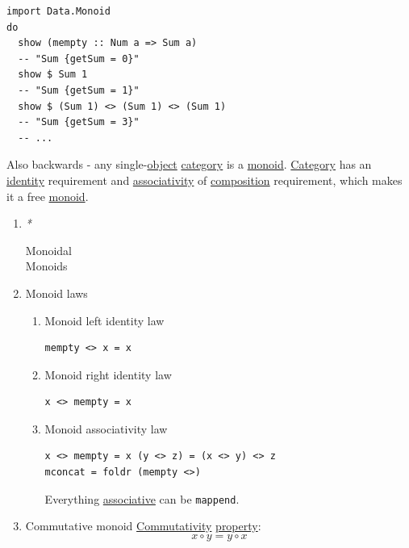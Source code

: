 \documentclass[11pt]{article}
\begin{document}
\begin{verbatim}
import Data.Monoid
do
  show (mempty :: Num a => Sum a)
  -- "Sum {getSum = 0}"
  show $ Sum 1
  -- "Sum {getSum = 1}"
  show $ (Sum 1) <> (Sum 1) <> (Sum 1)
  -- "Sum {getSum = 3}"
  -- ...
\end{verbatim}

Also backwards - any single-\hyperref[org4be0e9d]{object} \hyperref[org0450535]{category} is a \hyperref[org37d140b]{monoid}. \hyperref[org0450535]{Category} has an \hyperref[org9b95fd5]{identity} requirement and \hyperref[org488de22]{associativity} of \hyperref[orga128e7f]{composition} requirement, which makes it a free \hyperref[org37d140b]{monoid}.\\

\begin{enumerate}
\item \emph{*}
\label{sec:org9e96ca0}

\label{orgac4647e}Monoidal\\
\label{org3c213e6}Monoids\\

\item \label{orga5df823}Monoid laws
\label{sec:org3ac7d35}
\begin{enumerate}
\item \label{orge65c700}Monoid left identity law
\label{sec:org25c8748}
\begin{verbatim}
mempty <> x = x
\end{verbatim}

\item \label{org8244835}Monoid right identity law
\label{sec:orgf7f2d12}
\begin{verbatim}
x <> mempty = x
\end{verbatim}

\item \label{orgb99b1cb}Monoid associativity law
\label{sec:org62b4f47}
\begin{verbatim}
x <> mempty = x (y <> z) = (x <> y) <> z
mconcat = foldr (mempty <>)
\end{verbatim}

Everything \hyperref[orgbef8a27]{associative} can be \texttt{mappend}.\\
\end{enumerate}

\item \label{org332eb67}Commutative monoid
\label{sec:orgd866d75}
\hyperref[org78de62b]{Commutativity} \hyperref[orgf8c3cc7]{property}:\\
$$ x \circ y = y \circ x $$\\


\end{enumerate}
\end{document}
